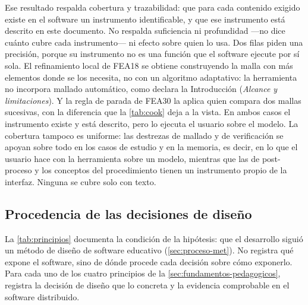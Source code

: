 Ese resultado respalda cobertura y trazabilidad: que para cada contenido exigido existe en el software un instrumento identificable, y que ese instrumento está descrito en este documento. No respalda suficiencia ni profundidad —no dice cuánto cubre cada instrumento— ni efecto sobre quien lo usa. Dos filas piden una precisión, porque su instrumento no es una función que el software ejecute por sí sola. El refinamiento local de FEA18 se obtiene construyendo la malla con más elementos donde se los necesita, no con un algoritmo adaptativo: la herramienta no incorpora mallado automático, como declara la Introducción (\emph{Alcance y limitaciones}). Y la regla de parada de FEA30 la aplica quien compara dos mallas sucesivas, con la diferencia que la \autoref{tab:cook} deja a la vista. En ambos casos el instrumento existe y está descrito, pero lo ejecuta el usuario sobre el modelo. La cobertura tampoco es uniforme: las destrezas de mallado y de verificación se apoyan sobre todo en los casos de estudio y en la memoria, es decir, en lo que el usuario hace con la herramienta sobre un modelo, mientras que las de post-proceso y los conceptos del procedimiento tienen un instrumento propio de la interfaz. Ninguna se cubre solo con texto.

\subsection{Procedencia de las decisiones de diseño}
\label{sec:trazabilidad-diseno}

La \autoref{tab:principios} documenta la condición de la hipótesis: que el desarrollo siguió un método de diseño de software educativo (\autoref{sec:proceso-met}). No registra qué expone el software, sino de dónde procede cada decisión sobre cómo exponerlo. Para cada uno de los cuatro principios de la \autoref{sec:fundamentos-pedagogicos}, registra la decisión de diseño que lo concreta y la evidencia comprobable en el software distribuido.


